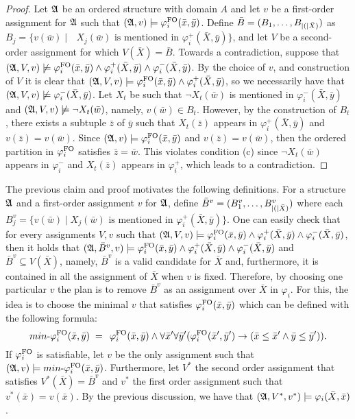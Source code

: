 \begin{proof}
Let $\mathfrak{A}$ be an ordered structure with domain $A$ and let $v$ be a first-order assignment for $\mathfrak{A}$ such that $(\mathfrak{A},v)\models\varphi^{{\rm FO}}_i(\bar{x},\bar{y})$.
Define $\bar{B} = (B_1,\ldots,B_{\vert ( \vert\bar{X})})$ as $B_j = \{v(\bar{w})\mid \text{ $X_j(\bar{w})$ is mentioned in $\varphi^{+}_i(\bar{X},\bar{y})$}\}$, and let $V$ be a second-order assignment for which $V(\bar{X}) = \bar{B}$.
Towards a contradiction, suppose that $(\mathfrak{A},V,v)\not\models \varphi^{{\rm FO}}_i(\bar{x},\bar{y}) \wedge \varphi^{+}_i(\bar{X}, \bar{y}) \wedge \varphi^{-}_i(\bar{X},\bar{y})$.
By the choice of $v$, and construction of $V$ it is clear that $(\mathfrak{A},V,v)\models\varphi^{{\rm FO}}_i(\bar{x},\bar{y})\wedge\varphi^{+}_i(\bar{X},\bar{y})$, so we necessarily have that $(\mathfrak{A},V,v)\not\models\varphi^{-}_i(\bar{X},\bar{y})$.
Let $X_t$ be such that $\neg X_t(\bar{w})$ is mentioned in $\varphi^{-}_i(\bar{X},\bar{y})$ and $(\mathfrak{A},V, v)\not\models\neg X_t(\bar{w})$, namely, $v(\bar{w})\in B_t$. 
However, by the construction of $B_t$, there exists a subtuple $\bar{z}$ of $\bar{y}$ such that $X_t(\bar{z})$ appears in $\varphi^{+}_i(\bar{X},\bar{y})$ and $v(\bar{z}) = v(\bar{w})$. Since $(\mathfrak{A},v)\models\varphi^{{\rm FO}}_i(\bar{x},\bar{y})$ and $v(\bar{z}) = v(\bar{w})$, then the ordered partition in $\varphi^{{\rm FO}}_i$ satisfies $\bar{z} = \bar{w}$. This violates condition (c) since $\neg X_t(\bar{w})$ appears in $\varphi^{-}_i$ and $X_t(\bar{z})$ appears in $\varphi^{+}_i$, which leads to a contradiction. 
\end{proof}

The previous claim and proof motivates the following definitions.
For a structure $\mathfrak{A}$ and a first-order assignment $v$ for $\mathfrak{A}$, define $\bar{B}^v = (B^v_1,\ldots,B^v_{\vert ( \vert\bar{X})})$ where each $B^v_j = \{v(\bar{w}) \mid \text{$X_j(\bar{w})$ is mentioned in $\varphi^{+}_i(\bar{X},\bar{y})$}\}$.
One can easily check that for every assignments $V, v$ such that $(\mathfrak{A},V,v)\models\varphi^{{\rm FO}}_i(\bar{x},\bar{y}) \wedge \varphi^{+}_i(\bar{X}, \bar{y}) \wedge \varphi^{-}_i(\bar{X},\bar{y})$, then it holds that $(\mathfrak{A},\bar{B}^v,v)\models\varphi^{{\rm FO}}_i(\bar{x},\bar{y}) \wedge \varphi^{+}_i(\bar{X}, \bar{y}) \wedge \varphi^{-}_i(\bar{X},\bar{y})$ and $\bar{B}^v \subseteq V(\bar{X})$, namely, $\bar{B}^v$ is a valid candidate for $\bar{X}$ and, furthermore, it is contained in all the assignment of $\bar{X}$ when $v$ is fixed.
Therefore, by choosing one particular $v$ the plan is to remove $\bar{B}^v$ as an assignment over $\bar{X}$ in $\varphi_i$. 
For this, the idea is to choose the minimal $v$ that satisfies $\varphi^{{\rm FO}}_i(\bar{x},\bar{y})$ which can be defined with the following formula:
$$
\text{$min$-}\varphi^{{\rm FO}}_i(\bar{x}, \bar{y}) \; = \;  \,\varphi_i^{{\rm FO}}(\bar{x},\bar{y})\wedge\forall\bar{x}'\forall\bar{y}'(\varphi_i^{{\rm FO}}(\bar{x}',\bar{y}')\to ( \bar{x}\leq\bar{x}' \wedge  \bar{y}\leq\bar{y}')).
$$ 
If $\varphi^{{\rm FO}}_i$ is satisfiable, let $v$ be the only assignment such that  $(\mathfrak{A},v)\models \text{$min$-}\varphi^{{\rm FO}}_i(\bar{x}, \bar{y})$. 
Furthermore, let $V^*$ the second order assignment that satisfies $V^*(\bar{X}) = \bar{B}^{v}$ and $v^*$ the first order assignment such that $v^*(\bar{x}) = v(\bar{x})$.
By the previous discussion, we have that $(\mathfrak{A},V^*,v^*)\models\varphi_i(\bar{X},\bar{x})$.


